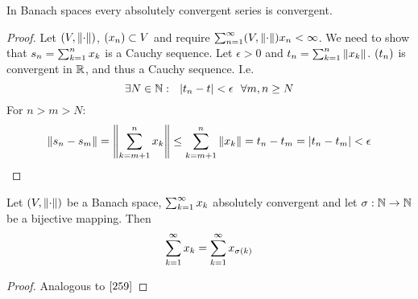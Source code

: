 \documentclass[../../script.tex] {subfiles}
\begin{document}
\begin{thm}
    In Banach spaces every absolutely convergent series is convergent.
\end{thm}
\begin{proof}
    Let $\normed$, $\anyseqdef{V}$ and require $\series{n} \normed{x_n} < \infty$. We need to show that $s_n = \series[n]{k} x_k$ is a Cauchy sequence.
    Let $\epsilon > 0$ and $t_n = \series[n]{k} \norm{x_k}$. $\seq{t}$ is convergent in $\realn$, and thus a Cauchy sequence.
    I.e. 
    \begin{equation}
        \exists N \in \natn: ~~|t_n - t| < \epsilon ~~\forall m, n \ge N
    \end{equation}
    For $n > m > N$:
    \begin{equation}
        \norm{s_n - s_m} = \norm{\sum_{k=m+1}^n x_k} \le \sum_{k=m+1}^n \norm{x_k} = t_n - t_m = |t_n - t_m| < \epsilon
    \end{equation}
\end{proof}

\begin{thm}
    Let $\normed$ be a Banach space, $\series{k} x_k$ absolutely convergent and let $\sigma: \natn \rightarrow \natn$ be a bijective mapping. Then 
    \[
        \series{k} x_k = \series{k} x_{\sigma(k)}
    \]
\end{thm}
\begin{proof}
    Analogous to $\Cref{259}$
\end{proof}
\end{document}
